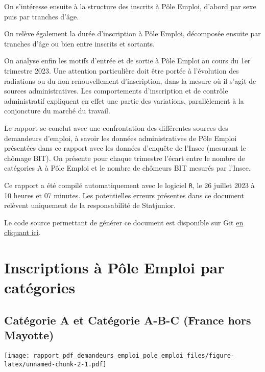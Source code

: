 \documentclass[
  paper=a4,
  ,captions=tableheading
]{scrartcl}
\begin{document}
On s'intéresse ensuite à la structure des inscrits à Pôle Emploi,
d'abord par sexe puis par tranches d'âge.

On relève également la durée d'inscription à Pôle Emploi, décomposée
ensuite par tranches d'âge ou bien entre inscrits et sortants.

On analyse enfin les motifs d'entrée et de sortie à Pôle Emploi au cours
du 1er trimestre 2023. Une attention particulière doit être portée à
l'évolution des radiations ou du non renouvellement d'inscription, dans
la mesure où il s'agit de sources administratives. Les comportements
d'inscription et de contrôle administratif expliquent en effet une
partie des variations, parallèlement à la conjoncture du marché du
travail.

Le rapport se conclut avec une confrontation des différentes sources des
demandeurs d'emploi, à savoir les données administratives de Pôle Emploi
présentées dans ce rapport avec les données d'enquête de l'Insee
(mesurant le chômage BIT). On présente pour chaque trimestre l'écart
entre le nombre de catégories A à Pôle Emploi et le nombre de chômeurs
BIT mesurés par l'Insee.

Ce rapport a été compilé automatiquement avec le logiciel \texttt{R}, le
26 juillet 2023 à 10 heures et 07 minutes. Les potentielles erreurs
présentes dans ce document relèvent uniquement de la responsabilité de
Statjunior.

Le code source permettant de générer ce document est disponible sur Git
\href{https://github.com/statjunior/Statjunior/tree/main/Conjoncture\%20-\%20comptes\%20trimestriels/}{en
cliquant ici}.

\hypertarget{inscriptions-uxe0-puxf4le-emploi-par-catuxe9gories}{%
\section{Inscriptions à Pôle Emploi par
catégories}\label{inscriptions-uxe0-puxf4le-emploi-par-catuxe9gories}}

\hypertarget{catuxe9gorie-a-et-catuxe9gorie-a-b-c-france-hors-mayotte}{%
\subsection{Catégorie A et Catégorie A-B-C (France hors
Mayotte)}\label{catuxe9gorie-a-et-catuxe9gorie-a-b-c-france-hors-mayotte}}

\texttt{[image: rapport\_pdf\_demandeurs\_emploi\_pole\_emploi\_files/figure-latex/unnamed-chunk-2-1.pdf]}
\end{document}
